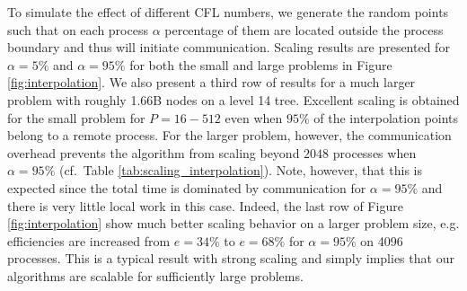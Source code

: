To simulate the effect of different CFL numbers, we generate the random points such that on each process $\alpha$ percentage of them are located outside the process boundary and thus will initiate communication. Scaling results are presented for $\alpha = 5 \%$ and $\alpha = 95\%$ for both the small and large problems in Figure \ref{fig:interpolation}. We also present a third row of results for a much larger problem with roughly 1.66B nodes on a level 14 tree. Excellent scaling is obtained for the small problem for $P = 16-512$ even when $95\%$ of the interpolation points belong to a remote process. For the larger problem, however, the communication overhead prevents the algorithm from scaling beyond $2048$ processes when $\alpha = 95\%$ (cf.\ Table \ref{tab:scaling_interpolation}). Note, however, that this is expected since the total time is dominated by communication for $\alpha = 95\%$ and there is very little local work in this case. Indeed, the last row of Figure \ref{fig:interpolation} show much better scaling behavior on a larger problem size, e.g. efficiencies are increased from $e=34\%$ to $e=68\%$ for $\alpha = 95\%$ on 4096 processes. This is a typical result with strong scaling and simply implies that our algorithms are scalable for sufficiently large problems.
